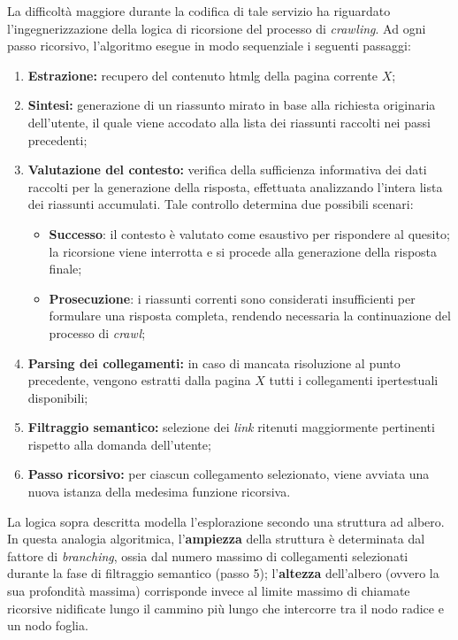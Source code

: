 La difficoltà maggiore durante la codifica di tale servizio ha riguardato 
l'ingegnerizzazione della logica di ricorsione del processo di \textit{crawling}. 
Ad ogni passo ricorsivo, l'algoritmo esegue in modo sequenziale i seguenti passaggi:
\begin{enumerate}
    \item \textbf{Estrazione:} recupero del contenuto \gls{htmlg} della pagina corrente $X$;
    \item \textbf{Sintesi:} generazione di un riassunto mirato in base alla richiesta originaria dell'utente, il quale viene accodato alla lista dei riassunti raccolti nei passi precedenti;
    \item \textbf{Valutazione del contesto:} verifica della sufficienza informativa dei dati raccolti per la generazione della risposta, effettuata analizzando l'intera lista dei riassunti accumulati. Tale controllo determina due possibili scenari:
    \begin{itemize}
        \item \textbf{Successo}: il contesto è valutato come esaustivo per rispondere al quesito; la ricorsione viene interrotta e si procede alla generazione della risposta finale;
        \item \textbf{Prosecuzione}: i riassunti correnti sono considerati insufficienti per formulare una risposta completa, rendendo necessaria la continuazione del processo di \textit{crawl};
    \end{itemize}
    \item \textbf{Parsing dei collegamenti:} in caso di mancata risoluzione al punto precedente, vengono estratti dalla pagina $X$ tutti i collegamenti ipertestuali disponibili;
    \item \textbf{Filtraggio semantico:} selezione dei \textit{link} ritenuti maggiormente pertinenti rispetto alla domanda dell'utente;
    \item \textbf{Passo ricorsivo:} per ciascun collegamento selezionato, viene avviata una nuova istanza della medesima funzione ricorsiva.
\end{enumerate}
La logica sopra descritta modella l'esplorazione secondo una struttura ad albero. 
In questa analogia algoritmica, l'\textbf{ampiezza} della struttura 
è determinata dal fattore di \textit{branching}, ossia dal numero massimo di collegamenti 
selezionati durante la fase di filtraggio semantico (passo 5); l'\textbf{altezza} 
dell'albero (ovvero la sua profondità massima) corrisponde invece al limite massimo 
di chiamate ricorsive nidificate lungo il cammino più lungo che intercorre tra il 
nodo radice e un nodo foglia.


